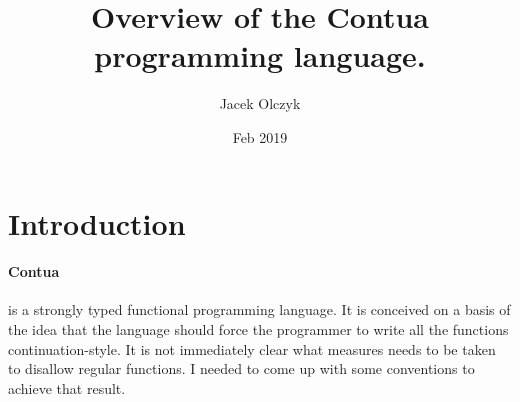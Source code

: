 \documentclass{article}
\title{Overview of the Contua programming language.}
\author{Jacek Olczyk}
\date{Feb 2019}
\begin{document}
\maketitle
\section{Introduction}
\paragraph{Contua} is a strongly typed functional programming language. It is conceived on a basis of the idea that the language should force the programmer to write all the functions continuation-style. It is not immediately clear what measures needs to be taken to disallow regular functions. I needed to come up with some conventions to achieve that result.
\end{document}
